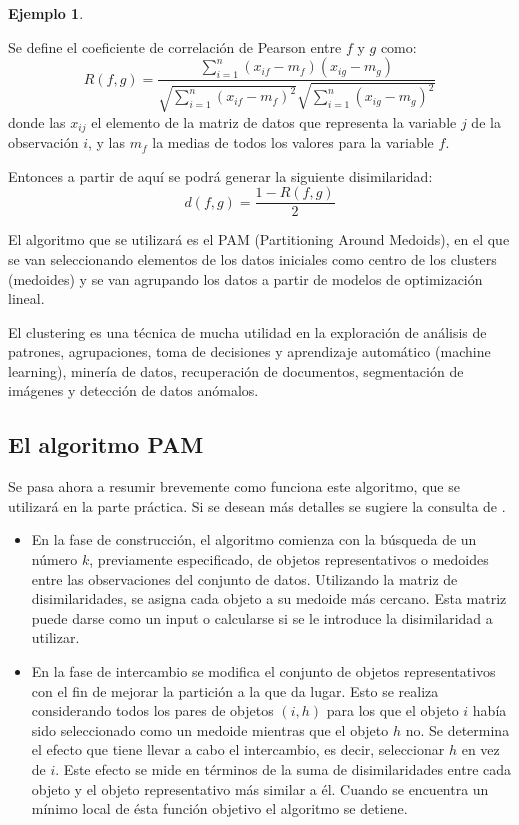 \documentclass{article}
\newtheorem*{exem}{Ejemplo}
\begin{document}
\begin{exem}
\end{exem}

Se define el coeficiente de correlación de Pearson entre $f$ y $g$ como:
$$
R(f,g)=\frac{\sum_{i=1}^{n}(x_{if}-m_{f})(x_{ig}-m_{g})}{\sqrt{\sum_{i=1}^{n}(x_{if}-m_{f})^{2}}\sqrt{\sum_{i=1}^{n}(x_{ig}-m_{g})^{2}}}
$$
donde las $x_{ij}$ el elemento de la matriz de datos que representa la variable $j$ de la observación $i$, y las $m_{f}$ la medias de todos los valores para la variable $f$.

Entonces a partir de aquí se podrá generar la siguiente disimilaridad:
$$
d(f,g)=\frac{1-R(f,g)}{2}
$$

El algoritmo que se utilizará es el PAM (Partitioning Around Medoids), en el que se van seleccionando elementos de los datos iniciales como centro de los clusters (medoides) y se van agrupando los datos a partir de modelos de optimización lineal.

\vspace{0.5cm}


El clustering es una técnica de mucha utilidad en la exploración de análisis de patrones, agrupaciones, toma de decisiones y aprendizaje automático (machine learning), minería de datos, recuperación de documentos, segmentación de imágenes y detección de datos anómalos.

\subsection*{El algoritmo PAM}

Se pasa ahora a resumir brevemente como funciona este algoritmo, que se utilizará en la parte práctica. Si se desean más detalles se sugiere la consulta de \cite{fgd}.

\begin{itemize}
\item En la fase de construcción, el algoritmo comienza con la búsqueda de un número $k$, previamente especificado, de objetos representativos o medoides entre las observaciones del conjunto de datos. Utilizando la matriz de disimilaridades, se asigna cada objeto a su medoide más cercano. Esta matriz puede darse como un input o calcularse si se le introduce la disimilaridad a utilizar.
\item En la fase de intercambio se modifica el conjunto de objetos representativos con el fin de mejorar la partición a la que da lugar. Esto se realiza considerando todos los pares de objetos $(i,h)$ para los que el objeto $i$ había sido seleccionado como un medoide mientras que el objeto $h$ no. Se determina el efecto que tiene llevar a cabo el intercambio, es decir, seleccionar $h$ en vez de $i$. Este efecto se mide en términos de la suma de disimilaridades entre cada objeto y el objeto representativo más similar a él. Cuando se encuentra un mínimo local de ésta función objetivo el algoritmo se detiene.
\end{itemize}
\end{document}
